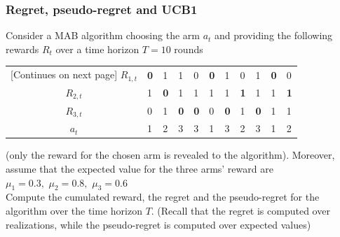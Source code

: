 \subsubsection{Regret, pseudo-regret and UCB1}
    Consider a MAB algorithm choosing the arm $a_t$ and providing the following rewards $R_t$ over a time horizon $T=10$ rounds
    \begin{tabularx}{\linewidth}{c|X X X X X X X X X X}
        \toprule
        \endfirsthead
        \toprule
        \midrule
        \endhead
        \footnotesize [Continues on next page]
        \endfoot
        \bottomrule
        \endlastfoot
        $R_{1,t}$ & \textbf{0} & 1 & 1 & 0 & \textbf{0} & 1 & 0 & 1 & \textbf{0} & 0\\
        $R_{2,t}$ & 1 & \textbf{0} & 1 & 1 & 1 & 1 & \textbf{1} & 1 & 1 & \textbf{1}\\
        $R_{3,t}$ & 0 & 1 & \textbf{0} & \textbf{0} & 0 & \textbf{0} & 1 & \textbf{0} & 1 & 1\\ \midrule
        $a_t$ & 1 & 2 & 3 & 3 & 1 & 3 & 2 & 3 & 1 & 2
    \end{tabularx}
    (only the reward for the chosen arm is revealed to the algorithm). Moreover, assume that the expected value for the three arms' reward are $\mu_1=0.3,\,\,\mu_2=0.8,\,\,\mu_3=0.6$\\
    Compute the cumulated reward, the regret and the pseudo-regret for the algorithm over the time horizon $T$. (Recall that the regret is computed over realizations, while the pseudo-regret is computed over expected values)
    

